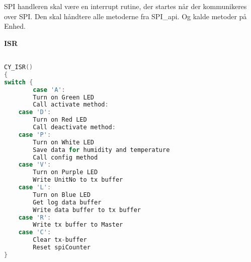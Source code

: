 
SPI handleren skal være en interrupt rutine, der startes når der kommunikeres over SPI. Den skal håndtere alle metoderne fra SPI\_api. Og kalde metoder på Enhed.

\textbf{ISR}

\begin{lstlisting}[language=C]

CY_ISR()
{
switch {
    	case 'A':
		Turn on Green LED
		Call activate method:                
	case 'D':
		Turn on Red LED
		Call deactivate method:  
	case 'P':
		Turn on White LED			
		Save data for humidity and temperature             
		Call config method
	case 'V':
		Turn on Purple LED  
		Write UnitNo to tx buffer  
	case 'L':
		Turn on Blue LED
		Get log data buffer
		Write data buffer to tx buffer
	case 'R':
		Write tx buffer to Master
	case 'C':
		Clear tx-buffer
		Reset spiCounter 
}
\end{lstlisting}